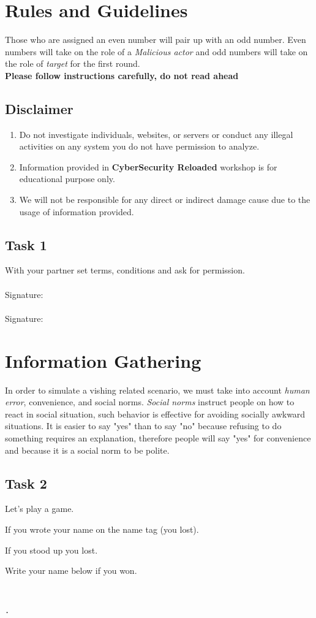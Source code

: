 \documentclass[12pt]{article}
\begin{document}
\section*{Rules and Guidelines}
Those who are assigned an even number will pair up with an odd number. Even numbers will take on the role of a \textit{Malicious actor} and odd numbers will take on the role of \textit{target} for the first round. 
\\
\textbf{Please follow instructions carefully, do not read ahead}
\subsection*{Disclaimer}
\begin{enumerate}
    \item Do not investigate individuals, websites, or servers or conduct any illegal activities on any system you do not have permission to analyze. 
    \item Information provided in \textbf{CyberSecurity Reloaded} workshop is for educational purpose only. 
    \item We will not be responsible for any direct or indirect damage cause due to the usage of information provided. 
\end{enumerate}
\subsection*{Task 1}
With your partner set terms, conditions and ask for permission. \\ \\
Signature: \hrulefill \\ \\
Signature: \hrulefill
\section*{Information Gathering}

In order to simulate a vishing related scenario, we must take into account \textit{human error},  convenience, and social norms. \textit{Social norms} instruct people on how to react in social situation, such behavior is effective for avoiding socially awkward situations. It is easier to say "yes" than to say "no" because refusing to do something requires an explanation, therefore people will say "yes"  for convenience and because it is a social norm to be polite. 
\subsection*{Task 2} 
Let's play a game.
\begin{todolist}
    \item If you wrote your name on the name tag (you lost). 
    \item If you stood up you lost.  
    \item Write your name below if you won. 
    \begin{lstlisting}


.
\end{lstlisting}
\end{todolist}
\end{document}
